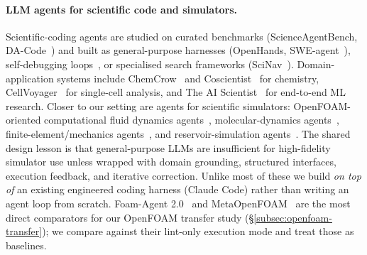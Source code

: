 \documentclass{article}
\begin{document}
\paragraph{LLM agents for scientific code and simulators.}
Scientific-coding agents are studied on curated benchmarks (ScienceAgentBench, DA-Code~\cite{chen2024scienceagentbench,huang2024dacode}) and built as general-purpose harnesses (OpenHands, SWE-agent~\cite{wang2024openhands,yang2024sweagent}), self-debugging loops~\cite{chen2024selfdebug}, or specialised search frameworks (SciNav~\cite{zhang2026scinav}). Domain-application systems include ChemCrow~\cite{bran2024chemcrow} and Coscientist~\cite{boiko2023coscientist} for chemistry, CellVoyager~\cite{alber2025cellvoyager} for single-cell analysis, and The AI Scientist~\cite{lu2024aiscientist,yamada2025ai} for end-to-end ML research. Closer to our setting are agents for scientific simulators: OpenFOAM-oriented computational fluid dynamics agents~\cite{chen2024metaopenfoam,pandey2025openfoamgpt,foamagent2025}, molecular-dynamics agents~\cite{shi2026mdagent2,guilbert2025dynamate,zhao2026polyjarvis}, finite-element/mechanics agents~\cite{zhan2025mooseagent,ni2024mechagents}, and reservoir-simulation agents~\cite{moyner2026jutulgpt}. The shared design lesson is that general-purpose LLMs are insufficient for high-fidelity simulator use unless wrapped with domain grounding, structured interfaces, execution feedback, and iterative correction. Unlike most of these we build \emph{on top of} an existing engineered coding harness (Claude Code) rather than writing an agent loop from scratch. Foam-Agent 2.0~\cite{foamagent2025} and MetaOpenFOAM~\cite{chen2024metaopenfoam} are the most direct comparators for our OpenFOAM transfer study (\S\ref{subsec:openfoam-transfer}); we compare against their lint-only execution mode and treat those as baselines.
\end{document}
